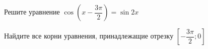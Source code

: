 \begin{ex}
	\begin{condition}
		\begin{enumcols}[label=\asbuk*)]
			\item Решите уравнение \( \cos {\left(x - \dfrac{3\pi}{2}\right)} = \sin 2x \)
			\item Найдите все корни уравнения, принадлежащие отрезку \( \left[-\dfrac{3\pi}{2};0\right] \)
		\end{enumcols}
	\end{condition}
\end{ex}